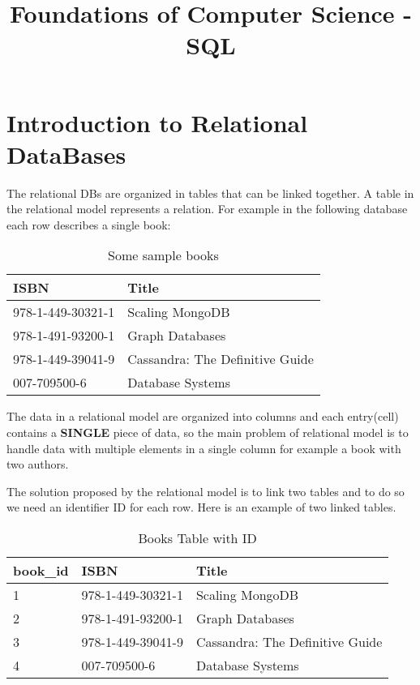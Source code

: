 \documentclass[a4page, 11pt]{article}
\title{Foundations of Computer Science  - SQL}
\author{}
\date{}
\begin{document}
\maketitle

\section{Introduction to Relational DataBases}

The relational DBs are organized in tables that can be linked together. A table in the relational model represents a relation. For example in the following database each row describes a single book:

\begin{table}[h]
	\centering
	\begin{tabular}{|l|l|}
		\hline
		
		\textbf{ISBN} & \textbf{Title}\\ 
		\hline
		978-1-449-30321-1 & Scaling MongoDB\\ 
		\hline
		978-1-491-93200-1 & Graph Databases\\ 
		\hline
		978-1-449-39041-9 & Cassandra: The Definitive Guide\\ 
		\hline
		007-709500-6 & Database Systems\\
		\hline
		
	\end{tabular}
	\caption{Some sample books}
\end{table}

The data in a relational model are organized into columns and each entry(cell) contains a \textbf{SINGLE} piece of data, so the main problem of relational model is to handle data with multiple elements in a single column for example a book with two authors.

The solution proposed by the relational model is to link two tables and to do so we need an identifier ID for each row.
Here is an example of two linked tables.

\begin{table}[h]
	\centering
	\begin{tabular}{|l|l|l|}
		\hline
		
		\textbf{book\_id} & \textbf{ISBN} & \textbf{Title}\\ 
		\hline
		1 & 978-1-449-30321-1 & Scaling MongoDB\\ 
		\hline
		2 & 978-1-491-93200-1 & Graph Databases\\ 
		\hline
		3 & 978-1-449-39041-9 & Cassandra: The Definitive Guide\\ 
		\hline
		4 & 007-709500-6 & Database Systems\\
		\hline
		
	\end{tabular}
	\caption{Books Table with ID}
\end{table}
\end{document}
